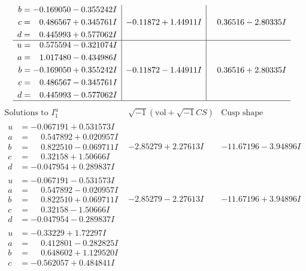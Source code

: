 \documentclass[1p]{elsarticle_modified}
\theoremstyle{definition}
\newcommand{\I}{\sqrt{-1}}
\begin{document}
$$\begin{array}{c|c|c}
\begin{aligned}
b &= -0.169050 - 0.355242 I \\
c &= \phantom{-}0.486567 + 0.345761 I \\
d &= \phantom{-}0.445993 + 0.577062 I\end{aligned}
 & -0.11872 + 1.44911 I & \phantom{-}0.36516 - 2.80335 I \\ \hline\begin{aligned}
u &= \phantom{-}0.575594 - 0.321074 I \\
a &= \phantom{-}1.017480 - 0.434986 I \\
b &= -0.169050 + 0.355242 I \\
c &= \phantom{-}0.486567 - 0.345761 I \\
d &= \phantom{-}0.445993 - 0.577062 I\end{aligned}
 & -0.11872 - 1.44911 I & \phantom{-}0.36516 + 2.80335 I\\
 \hline 
 \end{array}$$\newpage$$\begin{array}{c|c|c}  
\text{Solutions to }I^u_{1}& \I (\text{vol} + \sqrt{-1}CS) & \text{Cusp shape}\\
 \hline 
\begin{aligned}
u &= -0.067191 + 0.531573 I \\
a &= \phantom{-}0.547892 + 0.020957 I \\
b &= \phantom{-}0.822510 - 0.069711 I \\
c &= \phantom{-}0.32158 + 1.50666 I \\
d &= -0.047954 + 0.289837 I\end{aligned}
 & -2.85279 + 2.27613 I & -11.67196 - 3.94896 I \\ \hline\begin{aligned}
u &= -0.067191 - 0.531573 I \\
a &= \phantom{-}0.547892 - 0.020957 I \\
b &= \phantom{-}0.822510 + 0.069711 I \\
c &= \phantom{-}0.32158 - 1.50666 I \\
d &= -0.047954 - 0.289837 I\end{aligned}
 & -2.85279 - 2.27613 I & -11.67196 + 3.94896 I \\ \hline\begin{aligned}
u &= -0.33229 + 1.72297 I \\
a &= \phantom{-}0.412801 - 0.282825 I \\
b &= \phantom{-}0.648602 + 1.129520 I \\
c &= -0.562057 + 0.484841 I \\

\end{aligned}
\end{array}$$
\end{document}
